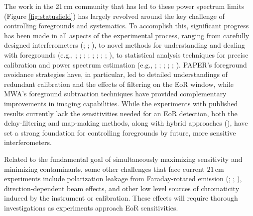 The work in the 21\,cm community that has led to these power spectrum limits (Figure \ref{fig:statusfield}) has largely revolved around the key challenge of controlling foregrounds and systematics. To accomplish this, significant progress has been made in all aspects of the experimental process, ranging from carefully designed interferometers (\citealt{lonsdale_et_al2009}; \citealt{parsons_et_al2012a}; \citealt{dillon_parsons2016}), to novel methods for understanding and dealing with foregrounds (e.g., \citealt{morales_et_al2006}; \citealt{datta_et_al2010}; \citealt{sullivan_et_al2012}; \citealt{moore_et_al2013}; \citealt{hazelton_et_al2013}; \citealt{pober_et_al2013b}; \citealt{liu_et_al2014a}; \citealt{liu_et_al2014b}; \citealt{Thyagarajan_et_al2015a}), to statistical analysis techniques for precise calibration and power spectrum estimation (e.g., \citealt{liu_et_al2010}; \citealt{trott_et_al2012}; \citealt{liu_et_al2014b}; \citealt{zheng_et_al2014}; \citealt{dillon_et_al2014}; \citealt{jacobs_et_al2016}). PAPER's foreground avoidance strategies have, in particular, led to detailed understandings of redundant calibration and the effects of filtering on the EoR window, while MWA's foreground subtraction techniques have provided complementary improvements in imaging capabilities. While the experiments with published results currently lack the sensitivities needed for an EoR detection, both the delay-filtering and map-making methods, along with hybrid approaches (\citealt{trott_et_al2016}), have set a strong foundation for controlling foregrounds by future, more sensitive interferometers.

Related to the fundamental goal of simultaneously maximizing sensitivity and minimizing contaminants, some other challenges that face current $21$\,cm experiments include polarization leakage from Faraday-rotated emission (\citealt{moore_et_al2013}; \citealt{kohn_et_al2016}; \citealt{nunhokee_et_al2017}), direction-dependent beam effects, and other low level sources of chromaticity induced by the instrument or calibration. These effects will require thorough investigations as experiments approach EoR sensitivities.

